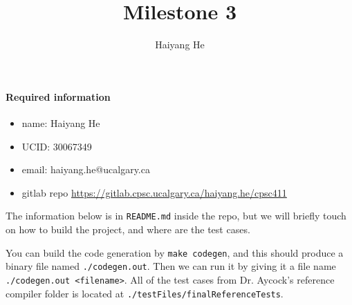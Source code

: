 \documentclass{article}
\author{Haiyang He}
\title{Milestone 3}
\begin{document}
\maketitle
\paragraph{Required information}
    \begin{itemize}
        \item name: Haiyang He
        \item UCID: 30067349
        \item email: haiyang.he@ucalgary.ca
        \item gitlab repo \url{https://gitlab.cpsc.ucalgary.ca/haiyang.he/cpsc411}
    \end{itemize}

    The information below is in \texttt{README.md} inside the repo, but we will briefly touch on how to build the project, and where are the test cases.

    You can build the code generation by \texttt{make codegen}, and this should produce a binary file named \texttt{./codegen.out}. Then we can run it by giving it a file name \texttt{./codegen.out <filename>}.
All of the test cases from Dr. Aycock's reference compiler folder is located at \texttt{./testFiles/finalReferenceTests}. 
\end{document}
